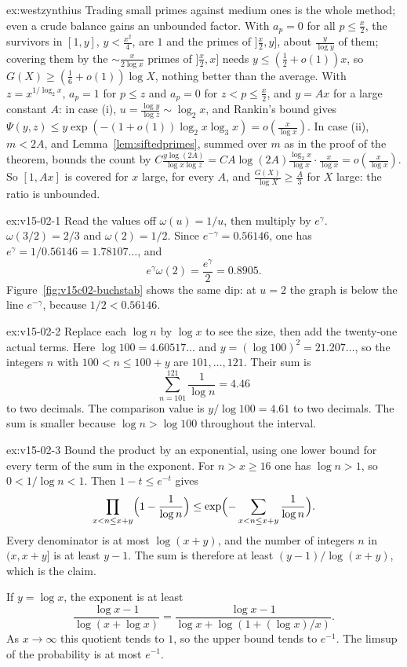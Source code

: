 \begin{solution}{ex:westzynthius}
\idea Trading small primes against medium ones is the whole method; even a crude balance gains an unbounded factor.
\writeup With $a_p=0$ for all $p\le\frac x2$, the survivors in $[1,y]$, $y<\frac{x^2}4$, are $1$ and the primes of $]\frac x2,y]$, about $\frac y{\log y}$ of them; covering them by the $\sim\frac x{2\log x}$ primes of $]\frac x2,x]$ needs $y\le(\frac12+o(1))x$, so $G(X)\ge(\frac16+o(1))\log X$, nothing better than the average. With $z=x^{1/\log_2x}$, $a_p=1$ for $p\le z$ and $a_p=0$ for $z<p\le\frac x2$, and $y=Ax$ for a large constant $A$: in case (i), $u=\frac{\log y}{\log z}\sim\log_2x$, and Rankin's bound gives $\Psi(y,z)\le y\exp(-(1+o(1))\log_2x\log_3x)=o(\frac x{\log x})$. In case (ii), $m<2A$, and Lemma~\ref{lem:siftedprimes}, summed over $m$ as in the proof of the theorem, bounds the count by $C\frac{y\log(2A)}{\log x\log z}=CA\log(2A)\frac{\log_2x}{\log x}\cdot\frac x{\log x}=o(\frac x{\log x})$. So $[1,Ax]$ is covered for $x$ large, for every $A$, and $\frac{G(X)}{\log X}\ge\frac A3$ for $X$ large: the ratio is unbounded.
\end{solution}

\begin{solution}{ex:v15-02-1}
\idea Read the values off \(\omega(u)=1/u\), then multiply by \(e^{\gamma}\).
\writeup \(\omega(3/2)=2/3\) and \(\omega(2)=1/2\). Since \(e^{-\gamma}=0.56146\), one has \(e^{\gamma}=1/0.56146=1.78107\ldots\), and
\[
e^{\gamma}\omega(2)=\frac{e^{\gamma}}2=0.8905.
\]
Figure~\ref{fig:v15c02-buchstab} shows the same dip: at \(u=2\) the graph is below the line \(e^{-\gamma}\), because \(1/2<0.56146\).
\end{solution}

\begin{solution}{ex:v15-02-2}
\idea Replace each \(\log n\) by \(\log x\) to see the size, then add the twenty-one actual terms.
\writeup Here \(\log100=4.60517\ldots\) and \(y=(\log100)^2=21.207\ldots\), so the integers \(n\) with \(100<n\le100+y\) are \(101,\dots,121\). Their sum is
\[
\sum_{n=101}^{121}\frac1{\log n}=4.46
\]
to two decimals. The comparison value is \(y/\log100=4.61\) to two decimals. The sum is smaller because \(\log n>\log100\) throughout the interval.
\end{solution}

\begin{solution}{ex:v15-02-3}
\idea Bound the product by an exponential, using one lower bound for every term of the sum in the exponent.
\writeup For \(n>x\ge16\) one has \(\log n>1\), so \(0<1/\log n<1\). Then \(1-t\le e^{-t}\) gives
\[
\prod_{x<n\le x+y}\Bigl(1-\frac1{\log n}\Bigr)
\le\exp\Bigl(-\sum_{x<n\le x+y}\frac1{\log n}\Bigr).
\]
Every denominator is at most \(\log(x+y)\), and the number of integers \(n\) in \((x,x+y]\) is at least \(y-1\). The sum is therefore at least \((y-1)/\log(x+y)\), which is the claim.

If \(y=\log x\), the exponent is at least
\[
\frac{\log x-1}{\log(x+\log x)}=\frac{\log x-1}{\log x+\log(1+(\log x)/x)}.
\]
As \(x\to\infty\) this quotient tends to \(1\), so the upper bound tends to \(e^{-1}\). The limsup of the probability is at most \(e^{-1}\).
\end{solution}

